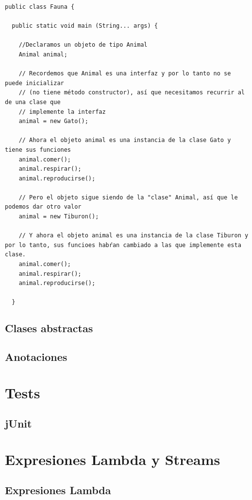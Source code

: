 \documentclass[11pt]{article}
\begin{document}
\begin{verbatim}
public class Fauna {

  public static void main (String... args) {

    //Declaramos un objeto de tipo Animal
    Animal animal;

    // Recordemos que Animal es una interfaz y por lo tanto no se puede inicializar
    // (no tiene método constructor), así que necesitamos recurrir al de una clase que
    // implemente la interfaz
    animal = new Gato();

    // Ahora el objeto animal es una instancia de la clase Gato y tiene sus funciones
    animal.comer();
    animal.respirar();
    animal.reproducirse();

    // Pero el objeto sigue siendo de la "clase" Animal, así que le podemos dar otro valor
    animal = new Tiburon();

    // Y ahora el objeto animal es una instancia de la clase Tiburon y por lo tanto, sus funcioes habŕan cambiado a las que implemente esta clase.
    animal.comer();
    animal.respirar();
    animal.reproducirse();

  }
\end{verbatim}

\subsection{Clases abstractas}
\label{sec:org8b3fbe5}
\subsection{Anotaciones}
\label{sec:org0016f8f}
\section{Tests}
\label{sec:org3c35ec7}
\subsection{jUnit}
\label{sec:orga8a0da3}
\section{Expresiones Lambda y Streams}
\label{sec:orgf560e9a}
\subsection{Expresiones Lambda}
\label{sec:org4804f5b}
\end{document}
